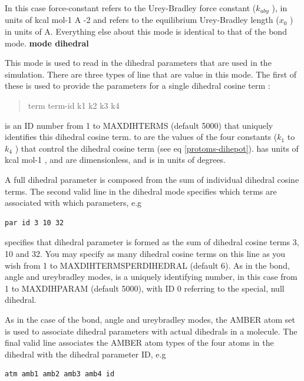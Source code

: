 \documentclass[letterpaper,10pt,english]{manual}
\begin{document}
In this case force-constant refers to the Urey-Bradley force constant ($k_{uby}$ ), in units of kcal mol-1 A -2 and  refers to the equilibrium Urey-Bradley length ($x_0$ ) in units of A. Everything else about this mode is identical to that of the bond mode.
\textbf{mode dihedral}

This mode is used to read in the dihedral parameters that are used in the simulation. There are three types of line that are value in this mode. The first of these is used to provide the parameters for a single dihedral cosine term :
\begin{quote}

term term-id k1 k2 k3 k4
\end{quote}

 is an ID number from 1 to MAXDIHTERMS (default 5000) that uniquely identifies this dihedral cosine term.  to  are the values of the four constants ($k_1$ to $k_4$ ) that control the dihedral cosine term (see eq \eqref{protoms-dihepot}).  has units of kcal mol-1 ,  and  are dimensionless, and  is in units of degrees.

A full dihedral parameter is composed from the sum of individual dihedral cosine terms. The second valid line in the dihedral mode specifies which terms are associated with which parameters, e.g

\begin{Verbatim}[commandchars=@\[\]]
par id 3 10 32
\end{Verbatim}

specifies that dihedral parameter  is formed as the sum of dihedral cosine terms 3, 10 and 32. You may specify as many dihedral cosine terms on this line as you wish from 1 to MAXDIHTERMSPERDIHEDRAL (default 6). As in the bond, angle and ureybradley modes,  is a uniquely identifying number, in this case from 1 to MAXDIHPARAM (default 5000), with ID 0 referring to the special, null dihedral.

As in the case of the bond, angle and ureybradley modes, the AMBER atom set is used to associate dihedral parameters with actual dihedrals in a molecule. The final valid line associates the AMBER atom types of the four  atoms in the dihedral with the dihedral parameter ID, e.g

\begin{Verbatim}[commandchars=@\[\]]
atm amb1 amb2 amb3 amb4 id
\end{Verbatim}
\end{document}
